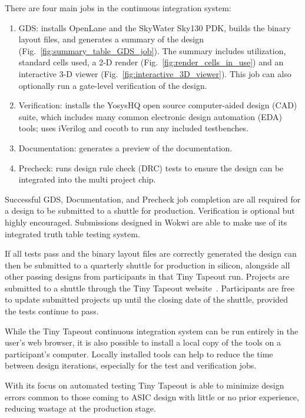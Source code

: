 There are four main jobs in the continuous integration system:

\begin{enumerate}
	\item GDS: installs OpenLane\cite{openlane} and the SkyWater Sky130\cite{skywaterpdk} PDK, builds the binary layout files, and generates a summary of the design (Fig.~\ref{fig:summary_table_GDS_job}). The summary includes utilization, standard cells used, a 2-D render (Fig.~\ref{fig:render_cells_in_use}) and an interactive 3-D viewer (Fig.~\ref{fig:interactive_3D_viewer}).
This job can also optionally run a gate-level verification of the design.
	\item Verification: installs the YosysHQ open source computer-aided design (CAD) suite, which includes many common electronic design automation (EDA) tools; uses iVerilog\cite{iverilog} and cocotb\cite{cocotb} to run any included testbenches.
	\item Documentation: generates a preview of the documentation.
	\item Precheck: runs design rule check (DRC) tests to ensure the design can be integrated into the multi project chip.
\end{enumerate}

Successful GDS, Documentation, and Precheck job completion are all required for a design to be submitted to a shuttle for production.
Verification is optional but highly encouraged. Submissions designed in Wokwi are able to make use of its integrated truth table testing system\cite{automatedtesting}.

If all tests pass and the binary layout files are correctly generated the design can then be submitted to a quarterly shuttle for production in silicon, alongside all other passing designs from participants in that Tiny Tapeout run. Projects are submitted to a shuttle through the Tiny Tapeout website~\cite{tinytapeout}. Participants are free to update submitted projects up until the closing date of the shuttle, provided the tests continue to pass.

While the Tiny Tapeout continuous integration system can be run entirely in the user's web browser, it is also possible to install a local copy of the tools\cite{localinstall} on a participant's computer. Locally installed tools can help to reduce the time between design iterations, especially for the test and verification jobs.

With its focus on automated testing Tiny Tapeout is able to minimize design errors common to those coming to ASIC design with little or no prior experience, reducing wastage at the production stage.

